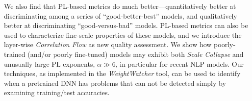 We also find that PL-based metrics do much better---quantitatively better at discriminating among a series of ``good-better-best'' models, and qualitatively better at discriminating ``good-versus-bad'' models.
PL-based metrics can also be used to characterize fine-scale properties of these models, and we introduce the layer-wise \emph{Correlation Flow} as new quality assessment.
We show how poorly-trained (and/or poorly fine-tuned) models may exhibit both \emph{Scale Collapse} and unusually large PL exponents, $\alpha\gg 6$, in particular for recent NLP models.
Our techniques, as implemented in the \emph{WeightWatcher} tool, can be used to identify when a pretrained DNN has problems that can not be detected simply by examining training/test accuracies.


